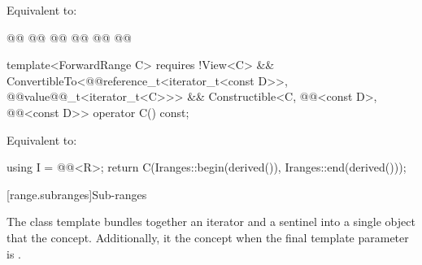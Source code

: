 {\begin{itemdescr}
\pnum
{}

\pnum
\effects Equivalent to: 
\end{itemdescr}

%
\begin{itemdecl}
@@
  @@
@@
@@
  @@
@@
\end{itemdecl}

\begin{itemdescr}
\pnum
{}

\pnum
{}
\end{itemdescr}

%
\begin{itemdecl}
template<ForwardRange C>
  requires !View<C> &&
    ConvertibleTo<@@reference_t<iterator_t<const D>>,
      @@value@@_t<iterator_t<C>>> &&
    Constructible<C, @@<const D>,
      @@<const D>>
operator C() const;
\end{itemdecl}

\begin{itemdescr}
\pnum
\effects Equivalent to:
\begin{codeblock}
using I = @@<R>;
return C(I{ranges::begin(derived())}, I{ranges::end(derived())});
\end{codeblock}
\end{itemdescr}


[range.subranges]{Sub-ranges}

\pnum
The  class template bundles together an
iterator and a sentinel into a single object that   the
 concept. Additionally, it   the
 concept when the final template parameter is
.

}
